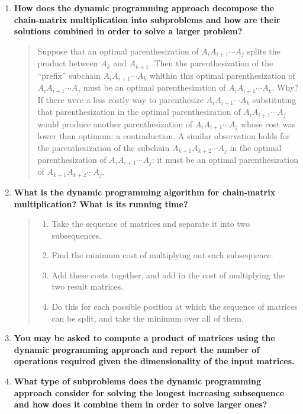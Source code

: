 \documentclass[a4paper,11pt]{article}
\begin{document}
\begin{enumerate}
\def\labelenumi{\arabic{enumi}.}
\item
  \textbf{How does the dynamic programming approach decompose the
  chain-matrix multiplication into subproblems and how are their
  solutions combined in order to solve a larger problem?}

  \begin{quote}
  Suppose that an optimal parenthesization of $A_i A_{i + 1} \cdots A_j$
  splits the product between $A_k$ and $A_{k + 1}$. Then the
  parenthesization of the ``prefix'' subchain $A_i A_{i + 1} \cdots A_k$
  whithin this optimal parenthesization of $A_i A_{i + 1} \cdots A_j$
  must be an optimal parenthesization of $A_i A_{i + 1} \cdots A_{k}$.
  Why? If there were a less costly way to parenthesize
  $A_i A_{i + 1} \cdots A_k$ substituting that parenthesization in the
  optimal parenthesization of $A_i A_{i + 1} \cdots A_j$ would produce
  another parenthesization of $A_i A_{i + 1} \cdots A_j$ whose cost was
  lower than optimum: a contraduction. A similar observation holds for
  the parenthesization of the subchain $A_{k + 1} A_{k + 2} \cdots A_j$
  in the optimal parenthesization of $A_i A_{i + 1} \cdots A_j$: it must
  be an optimal parenthesization of $A_{k + 1} A_{k + 2} \cdots A_j$.
  \end{quote}
\item
  \textbf{What is the dynamic programming algorithm for chain-matrix
  multiplication? What is its running time?}

  \begin{quote}
  \begin{enumerate}
  \def\labelenumii{\arabic{enumii}.}
  \itemsep1pt\parskip0pt
  \item
    Take the sequence of matrices and separate it into two subsequences.
  \item
    Find the minimum cost of multiplying out each subsequence.
  \item
    Add these costs together, and add in the cost of multiplying the two
    result matrices.
  \item
    Do this for each possible position at which the sequence of matrices
    can be split, and take the minimum over all of them.
  \end{enumerate}
  \end{quote}
\item
  \textbf{You may be asked to compute a product of matrices using the
  dynamic programming approach and report the number of operations
  required given the dimensionality of the input matrices.}
\item
  \textbf{What type of subproblems does the dynamic programming approach
  consider for solving the longest increasing subsequence and how does
  it combine them in order to solve larger ones?}


\end{enumerate}
\end{document}
